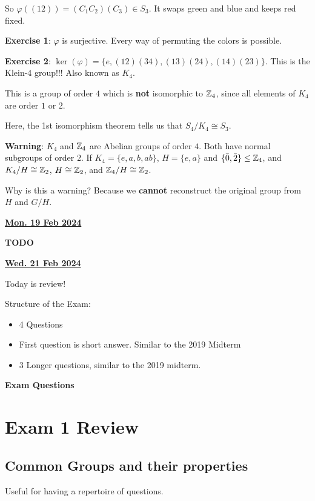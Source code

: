 \documentclass[12pt]{article}
\renewcommand{\date}[1]{\underline{\bf #1}}
\newcommand{\TODO}{\color{red}\textbf{TODO}\color{black}}
\begin{document}
So $\varphi((12)) = (C_1 C_2)(C_3) \in S_3$. It swaps green and blue and keeps
red fixed.

{\bf Exercise 1}: $\varphi$ is surjective. Every way of permuting the colors is
possible.

{\bf Exercise 2}: $\ker(\varphi) = \{e, (12)(34), (13)(24), (14)(23) \}$. This
is the Klein-4 group!!! Also known as $K_4$.

This is a group of order $4$ which is {\bf not} isomorphic to ${\mathbb Z}_4$, since all
elements of $K_4$ are order $1$ or $2$.

Here, the 1st isomorphism theorem tells us that $S_4 / K_4 \cong S_3$.

{\bf Warning}: $K_4$ and ${\mathbb Z}_4$ are Abelian groups of order $4$. Both have
normal subgroups of order $2$. If $K_4 = \{e, a, b, ab\}$, $H = \{e, a\}$ and
$\{\bar 0, \bar 2\} \le {\mathbb Z}_4$, and $K_4 / H \cong {\mathbb Z}_2$, $H \cong {\mathbb Z}_2$, and
${\mathbb Z}_4 / H \cong {\mathbb Z}_2$.

Why is this a warning? Because we {\bf cannot} reconstruct the original group
from $H$ and $G / H$.


\date{Mon. 19 Feb 2024}

\TODO{}

\date{Wed. 21 Feb 2024}

Today is review!

Structure of the Exam:
\begin{itemize}
  \item 4 Questions
  \item First question is short answer. Similar to the 2019 Midterm
  \item 3 Longer questions, similar to the 2019 midterm.
\end{itemize}

{\bf Exam Questions}

\section{Exam 1 Review}

\subsection{Common Groups and their properties}

Useful for having a repertoire of questions.
\end{document}
